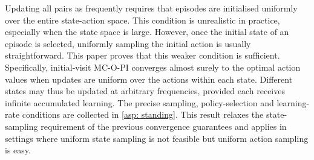 

Updating all pairs as frequently requires that episodes are initialised uniformly over the entire state-action space.
This condition is unrealistic in practice, especially when the state space is large.
However, once the initial state of an episode is selected, uniformly sampling the initial action is usually straightforward.
This paper proves that this weaker condition is sufficient.
Specifically, initial-visit MC-O-PI converges almost surely to the optimal action values when updates are uniform over the actions within each state.
Different states may thus be updated at arbitrary frequencies, provided each receives infinite accumulated learning. The precise sampling, policy-selection and learning-rate conditions are collected in \autoref{asp: standing}.
This result relaxes the state-sampling requirement of the previous convergence guarantees 
and applies in settings where uniform state sampling is not feasible but uniform action sampling is easy.


